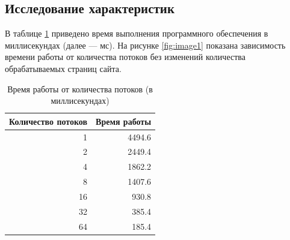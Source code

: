\subsection{Исследование характеристик}

В таблице \ref{tbl:time_measurements1} приведено время выполнения
программного обеспечения в миллисекундах (далее --- мс). На рисунке
\ref{fig:image1} показана зависимость времени работы от количества
потоков без изменений количества обрабатываемых страниц сайта.

\begin{table}[h]
	\begin{center}
		\begin{threeparttable}
		\captionsetup{justification=raggedright,singlelinecheck=off}
		\caption{Время работы от количества потоков (в миллисекундах)}
		\label{tbl:time_measurements1}
                    \begin{tabular}{|r|r|}
                        \hline
                        Количество потоков & Время работы\\
                        \hline
                        1 & 4494.6 \\
                         \hline
                        2 & 2449.4 \\
                         \hline
                        4 & 1862.2 \\
                         \hline
                        8 & 1407.6 \\
                         \hline
                        16 & 930.8 \\
                         \hline
                        32 & 385.4 \\
                         \hline
                        64 & 185.4 \\
                         \hline
                    \end{tabular}
		\end{threeparttable}
    \end{center}
\end{table}

